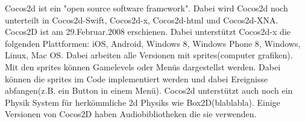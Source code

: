 Cocos2d ist ein "open source software framework". Dabei wird Cocos2d noch unterteilt in Cocos2d-Swift,
Cocos2d-x, Cocos2d-html und Cocos2d-XNA.
Cocos2D ist am 29.Februar.2008 erschienen. Dabei unterstützt Cocos2d-x die folgenden Plattformen: iOS, Android,
Windows 8, Windows Phone 8, Windows, Linux, Mac OS.
Dabei arbeiten alle Versionen mit sprites(computer grafiken). Mit den sprites können Gamelevels oder Menüs
dargestellst werden. Dabei können die sprites im Code implementiert werden und dabei Ereignisse 
abfangen(z.B. ein Button in einem Menü). 
Cocos2d unterstützt auch noch ein Physik System für herkömmliche 2d Physiks wie Box2D(blablabla).
Einige Versionen von Cocos2D haben Audiobibliotheken die sie verwenden. 